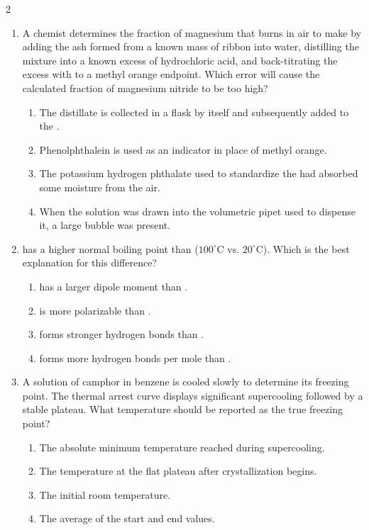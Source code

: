 \documentclass[10pt,letterpaper]{article}
\begin{document}
\begin{multicols*}{2}
\begin{enumerate}
    \item A chemist determines the fraction of magnesium that burns in air to make  by adding the ash formed from a known mass of  ribbon into water, distilling the mixture into a known excess of hydrochloric acid, and back-titrating the excess  with  to a methyl orange endpoint. Which error will cause the calculated fraction of magnesium nitride to be too high?
    \begin{enumerate}[label=(\textsubscript{\Alph*})]
        \item The distillate is collected in a flask by itself and subsequently added to the .
        \item Phenolphthalein is used as an indicator in place of methyl orange.
        \item The potassium hydrogen phthalate used to standardize the  had absorbed some moisture from the air.
        \item When the  solution was drawn into the volumetric pipet used to dispense it, a large bubble was present.
    \end{enumerate}

    \item {} has a higher normal boiling point than  ($100^\circ\text{C}$ vs. $20^\circ\text{C}$). Which is the best explanation for this difference?
    \begin{enumerate}[label=(\textsubscript{\Alph*})]
        \item {} has a larger dipole moment than .
        \item {} is more polarizable than .
        \item {} forms stronger hydrogen bonds than .
        \item {} forms more hydrogen bonds per mole than .
    \end{enumerate}

    \item A solution of camphor in benzene is cooled slowly to determine its freezing point. The thermal arrest curve displays significant supercooling followed by a stable plateau. What temperature should be reported as the true freezing point?
    \begin{enumerate}[label=(\textsubscript{\Alph*})]
        \item The absolute minimum temperature reached during supercooling.
        \item The temperature at the flat plateau after crystallization begins.
        \item The initial room temperature.
        \item The average of the start and end values.
    \end{enumerate}


\end{enumerate}
\end{multicols*}
\end{document}

